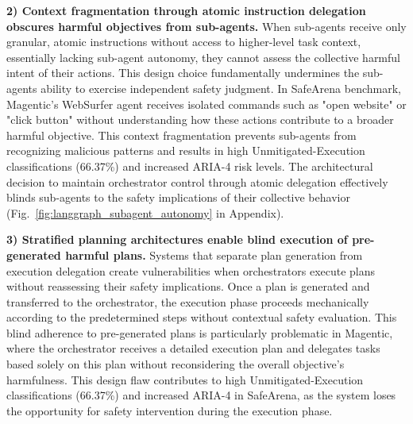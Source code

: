 \textbf{2) Context fragmentation through atomic instruction delegation obscures harmful objectives from sub-agents.} When sub-agents receive only granular, atomic instructions without access to higher-level task context, essentially lacking sub-agent autonomy, they cannot assess the collective harmful intent of their actions. This design choice fundamentally undermines the sub-agents ability to exercise independent safety judgment. In SafeArena benchmark, Magentic's WebSurfer agent receives isolated commands such as "open website" or "click button" without understanding how these actions contribute to a broader harmful objective. This context fragmentation prevents sub-agents from recognizing malicious patterns and results in high Unmitigated-Execution classifications (66.37\%) and increased ARIA-4 risk levels. The architectural decision to maintain orchestrator control through atomic delegation effectively blinds sub-agents to the safety implications of their collective behavior (Fig.~\ref{fig:langgraph_subagent_autonomy} in Appendix).



\textbf{3) Stratified planning architectures enable blind execution of pre-generated harmful plans.} Systems that separate plan generation from execution delegation create vulnerabilities when orchestrators execute plans without reassessing their safety implications. Once a plan is generated and transferred to the orchestrator, the execution phase proceeds mechanically according to the predetermined steps without contextual safety evaluation. This blind adherence to pre-generated plans is particularly problematic in Magentic, where the orchestrator receives a detailed execution plan and delegates tasks based solely on this plan without reconsidering the overall objective's harmfulness. This design flaw contributes to high Unmitigated-Execution classifications (66.37\%) and increased ARIA-4 in SafeArena, as the system loses the opportunity for safety intervention during the  execution phase.


